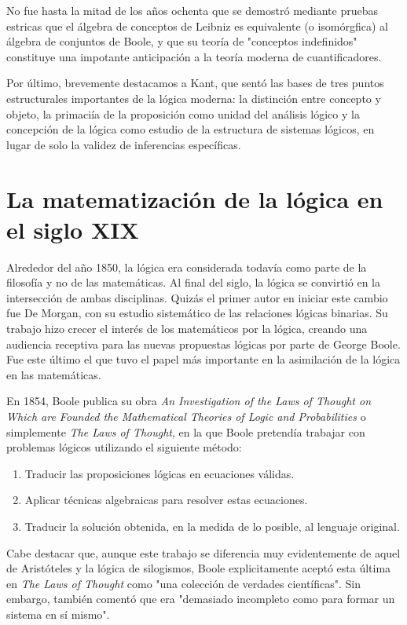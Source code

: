 \documentclass{article}
\begin{document}
No fue hasta la mitad de los años ochenta que se demostró mediante pruebas estricas que el álgebra de conceptos de Leibniz es equivalente (o isomórgfica) al álgebra de conjuntos de Boole, y que su teoría de "conceptos indefinidos" constituye una impotante anticipación a la teoría moderna de cuantificadores\cite{lenzen2004leibniz}.

Por último, brevemente destacamos a Kant, que sentó las bases de tres puntos estructurales importantes de la lógica moderna: la distinción entre concepto y objeto, la primaciía de la proposición como unidad del análisis lógico y la concepción de la lógica como estudio de la estructura de sistemas lógicos, en lugar de solo la validez de inferencias específicas\cite{tiles2004kant}.


\section{La matematización de la lógica en el siglo XIX}

Alrededor del año 1850, la lógica era considerada todavía como parte de la filosofía y no de las matemáticas. Al final del siglo, la lógica se convirtió en la intersección de ambas disciplinas. Quizás el primer autor en iniciar este cambio fue De Morgan, con su estudio sistemático de las relaciones lógicas binarias. Su trabajo hizo crecer el interés de los matemáticos por la lógica, creando una audiencia receptiva para las nuevas propuestas lógicas por parte de George Boole. Fue este último el que tuvo el papel más importante en la asimilación de la lógica en las matemáticas\cite{sanchez2004algebra}.

En 1854, Boole publica su obra \textit{An Investigation of the Laws of Thought on Which are Founded the Mathematical Theories of Logic and Probabilities} o simplemente \textit{The Laws of Thought}\cite{blackburn2005oxford}, en la que Boole pretendía trabajar con problemas lógicos utilizando el siguiente método:

\begin{enumerate}
    \item Traducir las proposiciones lógicas en ecuaciones válidas.
    \item Aplicar técnicas algebraicas para resolver estas ecuaciones.
    \item Traducir la solución obtenida, en la medida de lo posible, al lenguaje original\cite{sanchez2004algebra}.
\end{enumerate}

Cabe destacar que, aunque este trabajo se diferencia muy evidentemente de aquel de Aristóteles y la lógica de silogismos, Boole explicitamente aceptó esta última en \textit{The Laws of Thought} como "una colección de verdades científicas". Sin embargo, también comentó que era "demasiado incompleto como para formar un sistema en sí mismo".
\end{document}
